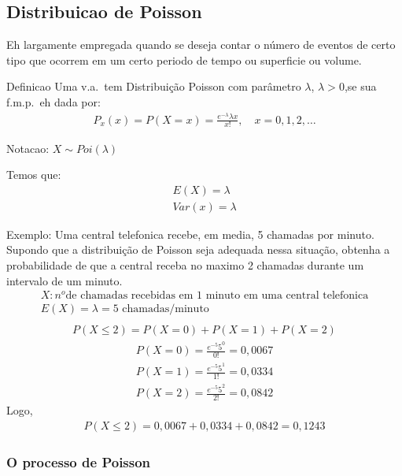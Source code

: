 \subsection{Distribuicao de Poisson}
Eh largamente empregada quando se deseja contar o número de eventos de certo tipo
que ocorrem em um certo periodo de tempo ou superficie ou volume.
\begin{description}
\item{Definicao} Uma v.a.\ tem Distribuição Poisson com parâmetro $\lambda$, $\lambda >0$,se sua
  f.m.p.\ eh dada por:
 \begin{align}
   P_{x} (x)= P(X=x)= \frac{e^{-\lambda}\lambda{x}}{x!}, \quad x=0,1,2,\ldots
 \end{align} 
 \item{Notacao}: $X \mathtt{\sim} Poi(\lambda)$
 \item{Temos que}:
   \begin{align}
     E(X)= \lambda \\
     Var(x)= \lambda
   \end{align}
   \item{Exemplo}: Uma central telefonica recebe, em media, 5 chamadas por minuto.
     Supondo que a distribuição de Poisson seja adequada nessa situação, obtenha a 
     probabilidade de que a central receba no maximo 2 chamadas durante um intervalo
     de um minuto.
     \begin{align*}
       X: n^{o} \text{de chamadas recebidas em 1 minuto em uma central telefonica}
       \\
       E(X)=\lambda= \text{5 chamadas/minuto}\\
     \end{align*}
     \begin{align*}
       P(X \leq 2)= P(X=0)+ P(X=1)+P(X=2)
     \end{align*}
     \begin{align*}
       P(X=0) = \frac{e^{-5}5^0}{0!}= 0,0067\\
       P(X=1) = \frac{e^{-5}5^1}{1!}= 0,0334\\
       P(X=2) = \frac{e^{-5}5^2}{2!}= 0,0842
     \end{align*}
     Logo,
     \begin{align*}
       P(X \leq 2)= 0,0067+0,0334+0,0842=0,1243
     \end{align*}
   \end{description}
     \subsubsection{O processo de Poisson}
     
